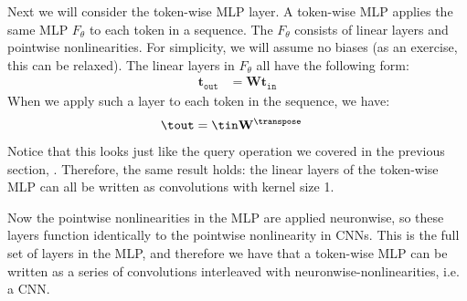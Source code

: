 Next we will consider the token-wise MLP layer. A token-wise MLP applies the same MLP $F_{\theta}$ to each token in a sequence. The $F_{\theta}$ consists of linear layers and pointwise nonlinearities. For simplicity, we will assume no biases (as an exercise, this can be relaxed). The linear layers in $F_{\theta}$ all have the following form:
\begin{align}
    \mathbf{t}_{\texttt{out}} &= \mathbf{W}\mathbf{t}_{\texttt{in}}
\end{align}
When we apply such a layer to each token in the sequence, we have:
\begin{align}
    \tout &= \tin\mathbf{W}^{\transpose}
\end{align}
Notice that this looks just like the query operation we covered in the previous section, \eqn{\ref{eqn:transformers:query_matrix}}. Therefore, the same result holds: the linear layers of the token-wise MLP can all be written as convolutions with kernel size 1.

Now the pointwise nonlinearities in the MLP are applied neuronwise, so these layers function identically to the pointwise nonlinearity in CNNs. This is the full set of layers in the MLP, and therefore we have that a token-wise MLP can be written as a series of convolutions interleaved with neuronwise-nonlinearities, i.e. a CNN.


